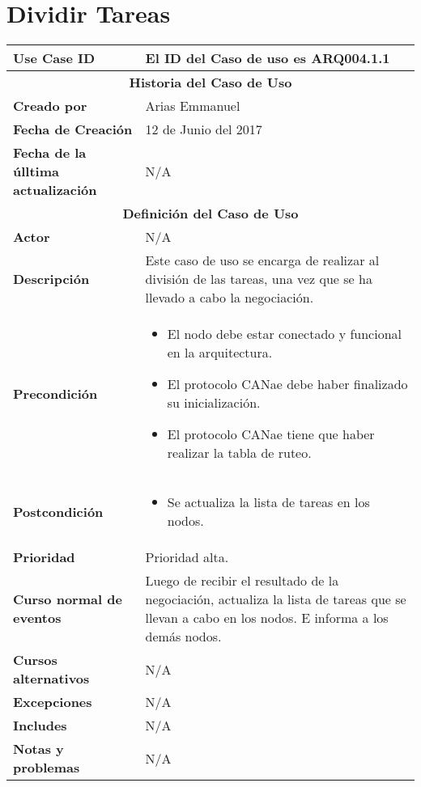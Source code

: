 
\section{Dividir Tareas}\label{uc:DividirTareas}

\begin{longtable}{|p{5cm}|p{8cm}|}
  \hline
  \textbf{Use Case ID} & El ID del Caso de uso es ARQ004.1.1 \\ \hline
  \multicolumn{2}{|c|}{\Large\textbf{Historia del Caso de Uso}} \\ \hline
  \textbf{Creado por} & Arias Emmanuel \\ \hline
  \textbf{Fecha de Creación} & 12 de Junio del 2017 \\ \hline
  \textbf{Fecha de la úlltima actualización} & N/A \\ \hline
  \multicolumn{2}{|c|}{\Large\textbf{Definición del Caso de Uso}} \\ \hline
  \textbf{Actor} & N/A \\ \hline
  \textbf{Descripción} & Este caso de uso se encarga de realizar al división de las tareas,
una vez que se ha llevado a cabo la negociación. \\ \hline
  \textbf{Precondición} & \begin{itemize}
\item El nodo debe estar conectado y funcional en la arquitectura.
\item El protocolo CANae debe haber finalizado su inicialización.
\item El protocolo CANae tiene que haber realizar la tabla de ruteo.
\end{itemize} \\ \hline
  \textbf{Postcondición}  & \begin{itemize}
  \item Se actualiza la lista de tareas en los nodos.
\end{itemize} \\ \hline
  \textbf{Prioridad} & Prioridad alta. \\ \hline
  \textbf{Curso normal de eventos} & Luego de recibir el resultado de la negociación, actualiza la lista
de tareas que se llevan a cabo en los nodos. E informa a los demás nodos. \\ \hline
\textbf{Cursos alternativos} & N/A \\ \hline
\textbf{Excepciones} & N/A \\ \hline
\textbf{Includes} & N/A \\ \hline
\textbf{Notas y problemas} & N/A \\ \hline
\end{longtable}

